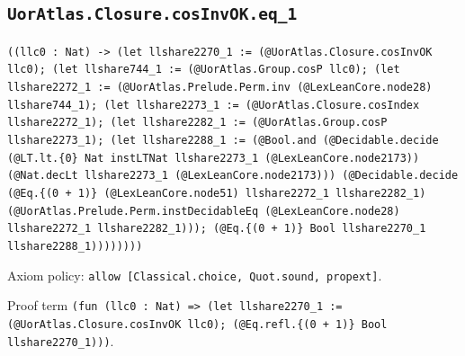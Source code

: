 \documentclass[11pt]{article}
\begin{document}
\subsection*{\texttt{UorAtlas.Closure.cosInvOK.eq\_1}}
\noindent\texttt{((llc0 : Nat) -> (let llshare2270\_1 := (@UorAtlas.Closure.cosInvOK llc0); (let llshare744\_1 := (@UorAtlas.Group.cosP llc0); (let llshare2272\_1 := (@UorAtlas.Prelude.Perm.inv (@LexLeanCore.node28) llshare744\_1); (let llshare2273\_1 := (@UorAtlas.Closure.cosIndex llshare2272\_1); (let llshare2282\_1 := (@UorAtlas.Group.cosP llshare2273\_1); (let llshare2288\_1 := (@Bool.and (@Decidable.decide (@LT.lt.\{0\} Nat instLTNat llshare2273\_1 (@LexLeanCore.node2173)) (@Nat.decLt llshare2273\_1 (@LexLeanCore.node2173))) (@Decidable.decide (@Eq.\{(0 + 1)\} (@LexLeanCore.node51) llshare2272\_1 llshare2282\_1) (@UorAtlas.Prelude.Perm.instDecidableEq (@LexLeanCore.node28) llshare2272\_1 llshare2282\_1))); (@Eq.\{(0 + 1)\} Bool llshare2270\_1 llshare2288\_1))))))))}\par
\noindent Axiom policy: \texttt{allow [Classical.choice, Quot.sound, propext]}.\par
\noindent Proof term \texttt{(fun (llc0 : Nat) => (let llshare2270\_1 := (@UorAtlas.Closure.cosInvOK llc0); (@Eq.refl.\{(0 + 1)\} Bool llshare2270\_1)))}.\par
\end{document}
